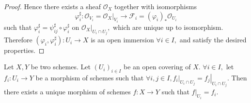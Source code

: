 \begin{proof}
Hence there exists a sheaf $\mathcal {O}_X$ together with
isomorphisms $$\varphi_i^{\sharp}: \mathcal {O}_{V_i} =
\left.\mathcal {O}_X\right|_{V_i}\rightarrow\mathscr{F}_i =
(\varphi_i)_{\ast}\mathcal {O}_{U_i}$$ such that
$\varphi_i^{\sharp}=\psi_{ij}^{\sharp}\circ\varphi_i^{\sharp}$ on
$\left.\mathcal {O}_X\right|_{U_i\cap U_j},$ which are unique up to
isomorphism. Therefore $(\varphi_i,\varphi_i^{\sharp}):
U_i\rightarrow X$ is an open immersion $\forall i\in I,$ and satisfy
the desired properties.
\end{proof}
\begin{prop}
Let $X,Y$ be two schemes. Let $(U_i)_{i\in I}$ be an open covering
of $X.$ $\forall i\in I,$ let $f_i: U_i\rightarrow Y$ be a morphism
of schemes such that $\forall i,j\in I, \left.f_i\right|_{U_i\cap
U_j}=\left.f_j\right|_{U_i\cap U_j}.$ Then there exists a unique
morphism of schemes $f:X\rightarrow Y$ such that
$\left.f\right|_{U_i}=f_i.$
\end{prop}
